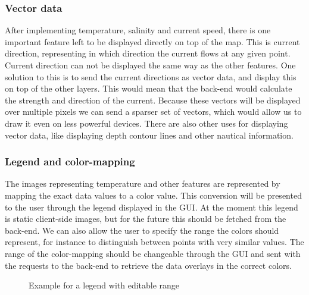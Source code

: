 \documentclass[11pt,a4paper,titlepage,oneside]{report}
\begin{document}
\subsubsection{Vector data}
After implementing temperature, salinity and current speed, there is one important feature left to be displayed directly on top of the map. This is current direction, representing in which direction the current flows at any given point. Current direction can not be displayed the same way as the other features. One solution to this is to send the current directions as vector data, and display this on top of the other layers. This would mean that the \gls{back-end} would calculate the strength and direction of the current. Because these vectors will be displayed over multiple pixels we can send a sparser set of vectors, which would allow us to draw it even on less powerful devices.
There are also other uses for displaying vector data, like displaying depth contour lines and other nautical information.

\subsubsection{Legend and color-mapping}
The images representing temperature and other features are represented by mapping the exact data values to a color value. This conversion will be presented to the user through the legend displayed in the \gls{GUI}. At the moment this legend is static client-side images, but for the future this should be fetched from the \gls{back-end}. We can also allow the user to specify the range the colors should represent, for instance to distinguish between points with very similar values. The range of the color-mapping should be changeable through the \gls{GUI} and sent with the requests to the \gls{back-end} to retrieve the data overlays in the correct colors.

\begin{figure}[!htb]
  \begin{center}
    \caption{Example for a legend with editable range}
    \label{fig:gui_legendEdit}
  \end{center}
\end{figure}
\end{document}
